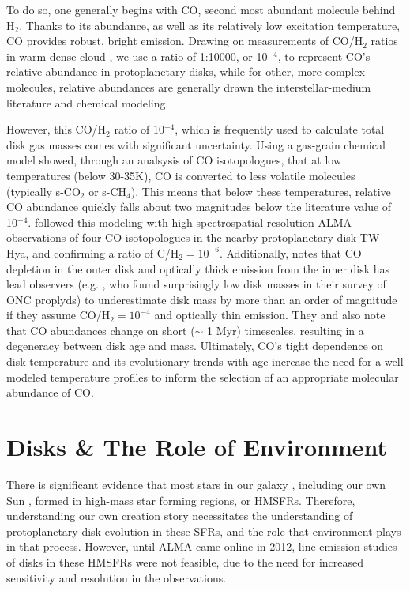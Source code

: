 To do so, one generally begins with CO, second most abundant molecule behind H$_2$. Thanks to its abundance, as well as its relatively low excitation temperature, CO provides robust, bright emission. Drawing on measurements of CO/H$_2$ ratios in warm dense cloud \citep{AikawaHerbst2003,Fogel2011}, we use a ratio of 1:10000, or 10$^{-4}$, to represent CO's relative abundance in protoplanetary disks, while for other, more complex molecules, relative abundances are generally drawn the interstellar-medium literature and chemical modeling.

However, this CO/H$_2$ ratio of 10$^{-4}$, which is frequently used to calculate total disk gas masses  comes with significant uncertainty. Using a gas-grain chemical model \citet{Reboussin2015} showed, through an analsysis of CO isotopologues, that at low temperatures (below 30-35K), CO is converted to less volatile molecules (typically s-CO$_2$ or s-CH$_4$). This means that below these temperatures, relative CO abundance quickly falls about two magnitudes below the literature value of 10$^{-4}$. \citet{Schwarz2016} followed this modeling with high spectrospatial resolution ALMA observations of four CO isotopologues in the nearby protoplanetary disk TW Hya, and confirming a ratio of C/H$_2 = 10^{-6}$. Additionally, \cite{Yu2017} notes that CO depletion in the outer disk and optically thick emission from the inner disk has lead observers (e.g. \citet{Ansdell2017}, who found surprisingly low disk masses in their survey of ONC proplyds) to underestimate disk mass by more than an order of magnitude if they assume CO/H$_2 = 10^{-4}$ and optically thin emission. They and \cite{Cleeves2015} also note that CO abundances change on short ($\sim$ 1 Myr) timescales, resulting in a degeneracy between disk age and mass. Ultimately, CO's tight dependence on disk temperature and its evolutionary trends with age increase the need for a well modeled temperature profiles to inform the selection of an appropriate molecular abundance of CO.



\section{Disks \& The Role of Environment}



There is significant evidence that most stars in our galaxy \citep{LadaLada2003,Mann2015}, including our own Sun \citep{Gaidos2009,Tachibana2006}, formed in high-mass star forming regions, or HMSFRs. Therefore, understanding our own creation story necessitates the understanding of protoplanetary disk evolution in these SFRs, and the role that environment plays in that process. However, until ALMA came online in 2012, line-emission studies of disks in these HMSFRs were not feasible, due to the need for increased sensitivity and resolution in the observations.

